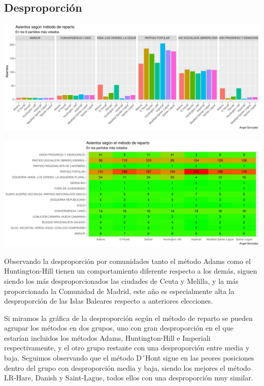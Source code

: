 \documentclass[12pt,a4paper,]{book}
\numberwithin{dummy}{section}
\theoremstyle{ocrenumbox}
\theoremstyle{blacknumex}
\theoremstyle{blacknumbox}
\theoremstyle{ocrenum}
\theoremstyle{ocrenum}
\begin{document}
\hypertarget{desproporciuxf3n-7}{%
\subsection{Desproporción}\label{desproporciuxf3n-7}}

\begin{center}\includegraphics[width=1\linewidth]{figurasR/unnamed-chunk-100-1} \end{center}

\begin{center}\includegraphics[width=1\linewidth]{figurasR/unnamed-chunk-100-2} \end{center}

Observando la desproporción por comunidades tanto el método Adams como
el Huntington-Hill tienen un comportamiento diferente respecto a los
demás, siguen siendo los más desproporcionados las ciudades de Ceuta y
Melilla, y la más proporcionada la Comunidad de Madrid, este año es
especialmente alta la desproporción de las Islas Baleares respecto a
anteriores elecciones.

Si miramos la gráfica de la desproporción según el método de reparto se
pueden agrupar los métodos en dos grupos, uno con gran desproporción en
el que estarían incluidos los métodos Adams, Huntington-Hill e Imperiali
respectivamente, y el otro grupo restante con una desproporción entre
media y baja. Seguimos observando que el método D´Hont sigue en las
peores posiciones dentro del grupo con desproporción media y baja,
siendo los mejores el método LR-Hare, Danish y Saint-Lague, todos ellos
con una desproporción muy similar.
\end{document}
